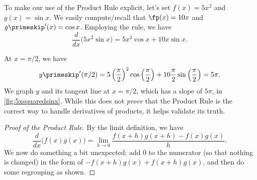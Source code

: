 {To make our use of the Product Rule explicit, let's set $f(x) = 5x^2$ and $g(x) = \sin x$. We easily compute/recall that $\fp(x) = 10x$ and $g\primeskip'(x) = \cos x$. Employing the rule, we have $$\frac{d}{dx}\Big(5x^2\sin x\Big) = 5x^2\cos x + 10x\sin x.$$


At $x=\pi/2$, we have $$y\primeskip'(\pi/2) = 5\left(\frac{\pi}{2}\right)^2\cos \left(\frac{\pi}2\right) + 10\frac{\pi}2 \sin\left(\frac{\pi}{2}\right) = 5\pi.$$ We graph $y$ and its tangent line at $x=\pi/2$, which has a slope of $5\pi$, in \autoref{fig:5xsquaredsinx}. While this does not \textit{prove} that the Product Rule is the correct way to handle derivatives of products, it helps validate its truth.}

\begin{proof}[Proof of the Product Rule]
By the limit definition, we have 
\[\frac{d}{dx}\Big(f(x)g(x)\Big) =\lim_{h\to0} \frac{f(x+h)g(x+h)-f(x)g(x)}{h}.\]
We now do something a bit unexpected; add 0 to the numerator (so that nothing is changed) in the form of $-f(x+h)g(x)+f(x+h)g(x)$, and then do some regrouping as shown.

\end{proof}

